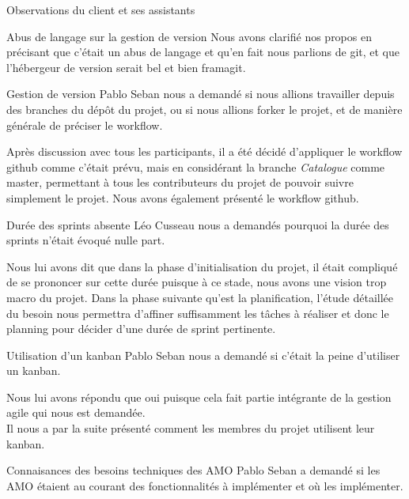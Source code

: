 \documentclass[]{article}
\begin{document}
\begin{section}{Observations du client et ses assistants}
\begin{subsection}{Abus de langage sur la gestion de version}
            Nous avons clarifié nos propos en précisant que c'était un abus de langage et qu'en fait nous parlions de git, et 
            que l'hébergeur de version serait bel et bien framagit.
        \end{subsection}

        \begin{subsection}{Gestion de version}
            Pablo Seban nous a demandé si nous allions travailler depuis des branches du dépôt du projet, ou si nous allions
            forker le projet, et de manière générale de préciser le workflow.

            Après discussion avec tous les participants, il a été décidé d'appliquer le workflow github comme c'était prévu, 
            mais en considérant la branche \emph{Catalogue} comme master, permettant à tous les contributeurs du projet de 
            pouvoir suivre simplement le projet. Nous avons également présenté le workflow github.
        \end{subsection}

        \begin{subsection}{Durée des sprints absente}
            Léo Cusseau nous a demandés pourquoi la durée des sprints n'était évoqué nulle part.

            Nous lui avons dit que dans la phase d'initialisation du projet, il était compliqué de se prononcer sur cette durée 
            puisque à ce stade, nous avons une vision trop macro du projet. Dans la phase suivante qu'est la planification, 
            l'étude détaillée du besoin nous permettra d'affiner suffisamment les tâches à réaliser et donc le planning pour 
            décider d'une durée de sprint pertinente.
        \end{subsection}

        \begin{subsection}{Utilisation d'un kanban}
            Pablo Seban nous a demandé si c'était la peine d'utiliser un kanban.

            Nous lui avons répondu que oui puisque cela fait partie intégrante de la gestion agile qui nous est demandée.\\
            Il nous a par la suite présenté comment les membres du projet utilisent leur kanban.
        \end{subsection}

        \begin{subsection}{Connaisances des besoins techniques des AMO}
            Pablo Seban a demandé si les AMO étaient au courant des fonctionnalités à implémenter et où les implémenter.


\end{subsection}
\end{section}
\end{document}
